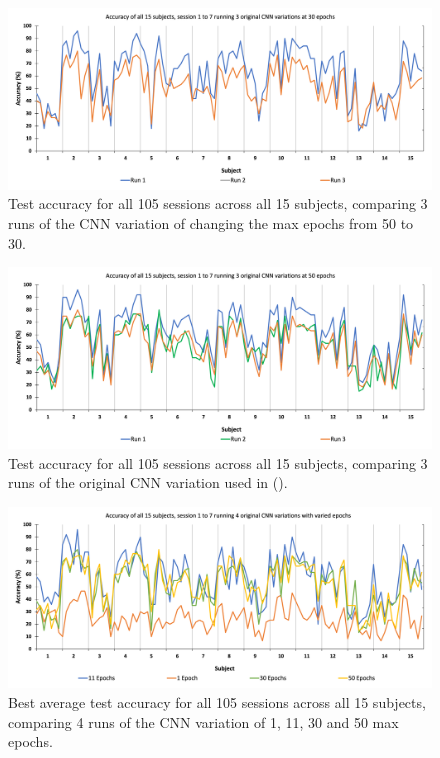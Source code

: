 \begin{figure}[H]
\centering
\includegraphics[scale=0.5]{Media/SBJ1-15_S1-7/SBJ1-15&S1-7_3_Runs_30_Epochs_Accuracy.png}
\caption{Test accuracy for all 105 sessions across all 15 subjects, comparing 3 runs of the CNN variation of changing the max epochs from 50 to 30.}
\label{S1-7 30 Epochs Acc}
\end{figure}

\begin{figure}[H]
\centering
\includegraphics[scale=0.5]{Media/SBJ1-15_S1-7/SBJ1-15&S1-7_3_Runs_50_Epochs_Accuracy.png}
\caption{Test accuracy for all 105 sessions across all 15 subjects, comparing 3 runs of the original CNN variation used in (\cite{PalaniPaper}).}
\label{S1-7 50 Epochs Acc}
\end{figure}

\begin{figure}[H]
\centering
\includegraphics[scale=0.5]{Media/SBJ1-15_S1-7/SBJ1-15&S1-7_Varied_Epochs_Accuracy.png}
\caption{Best average test accuracy for all 105 sessions across all 15 subjects, comparing 4 runs of the CNN variation of 1, 11, 30 and 50 max epochs.}
\label{S1-7 Varied Epochs Acc}
\end{figure}

